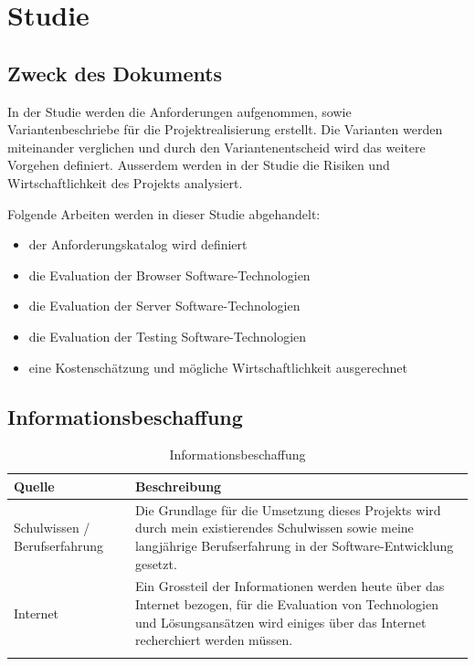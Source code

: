 \chapter{Studie}

\label{AppendixStudie}

\section{Zweck des Dokuments}\label{StudieZweck}

In der Studie werden die Anforderungen aufgenommen, sowie Variantenbeschriebe
für die Projektrealisierung erstellt. Die Varianten werden miteinander
verglichen und durch den Variantenentscheid wird das weitere
Vorgehen definiert.
Ausserdem werden in der Studie die Risiken und Wirtschaftlichkeit des Projekts
analysiert.

Folgende Arbeiten werden in dieser Studie abgehandelt:

\begin{itemize}
  \tightlist
  \item der Anforderungskatalog wird definiert
  \item die Evaluation der Browser Software-Technologien
  \item die Evaluation der Server Software-Technologien
  \item die Evaluation der Testing Software-Technologien
  \item eine Kostenschätzung und mögliche Wirtschaftlichkeit ausgerechnet
\end{itemize}


\section{Informationsbeschaffung}\label{informationsbeschaffung}

\begin{longtable}[]{@{}lp{10cm}@{}}
  \toprule
  Quelle                        & Beschreibung\tabularnewline
  \toprule
  Schulwissen / Berufserfahrung & Die Grundlage für die Umsetzung dieses Projekts wird durch mein existierendes Schulwissen sowie meine langjährige Berufserfahrung in der Software-Entwicklung gesetzt.\tabularnewline
  \midrule
  Internet                      & Ein Grossteil der Informationen werden heute über das Internet bezogen, für die Evaluation von Technologien und Lösungsansätzen wird einiges über das Internet recherchiert werden müssen.\tabularnewline
  \bottomrule
  \caption{Informationsbeschaffung}
\end{longtable}

